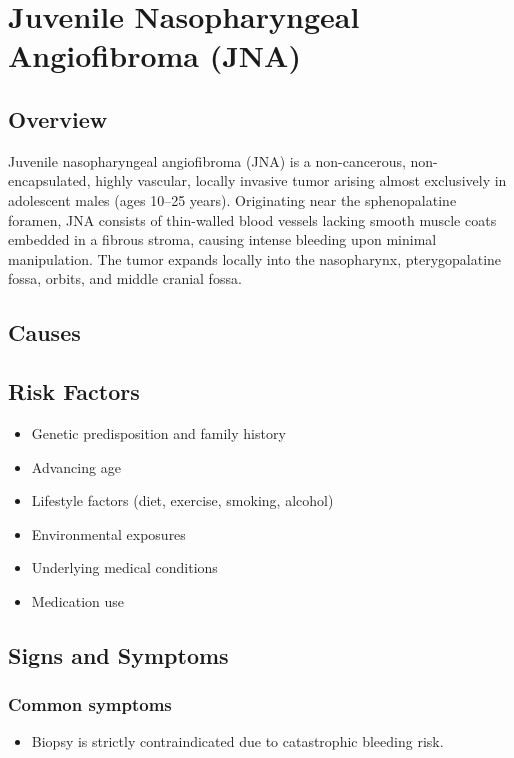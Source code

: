 \chapter{Juvenile Nasopharyngeal Angiofibroma (JNA)}
\label{sec:Juvenile Nasopharyngeal Angiofibroma (JNA)}

\section{Overview}
Juvenile nasopharyngeal angiofibroma (JNA) is a non-cancerous, non-encapsulated, highly vascular, locally invasive tumor arising almost exclusively in adolescent males (ages 10--25 years). Originating near the sphenopalatine foramen, JNA consists of thin-walled blood vessels lacking smooth muscle coats embedded in a fibrous stroma, causing intense bleeding upon minimal manipulation. The tumor expands locally into the nasopharynx, pterygopalatine fossa, orbits, and middle cranial fossa.
\section{Causes}
\section{Risk Factors}

\begin{itemize}[noitemsep]
  \item Genetic predisposition and family history
  \item Advancing age
  \item Lifestyle factors (diet, exercise, smoking, alcohol)
  \item Environmental exposures
  \item Underlying medical conditions
  \item Medication use
\end{itemize}
\section{Signs and Symptoms}

\subsection{Common symptoms}
\begin{itemize}[noitemsep]
  \item Biopsy is strictly contraindicated due to catastrophic bleeding risk. 
  \end{itemize}

